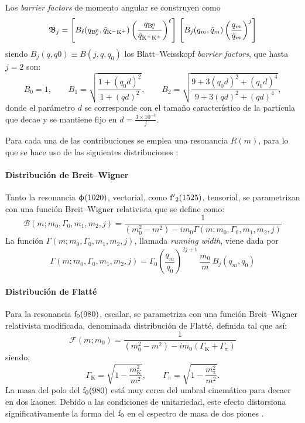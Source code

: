 Los \emph{barrier factors} de momento angular se construyen como \cite{blatt2012theoretical}
\begin{equation}
\mathfrak{B}_j = \left[ B_{\ell}(q_{\mathrm{B}{}_{\mathrm{s}}^{0}},\tilde{q}_{\mathrm{K}{}^{-}\mathrm{K}{}^{+}}) \left( \frac{q_{\mathrm{B}{}_{\mathrm{s}}^{0}}}{\tilde{q}_{\mathrm{K}{}^{-}\mathrm{K}{}^{+}}} \right)^{\ell}\right] \, \left[ B_j(q_m,\tilde{q}_m) \left( \frac{q_m}{\tilde{q}_m} \right)^j\right]
\end{equation}
siendo $B_j(q,q0) \equiv B(j,q,q_0)$ los Blatt--Weisskopf \emph{barrier factors}, que hasta $j=2$ son:
\begin{equation} 
B_0 = 1, \qquad B_1 = \sqrt{\frac{1+(q_0d)^2}{1+(qd)^2}}, \qquad B_2 = \sqrt{\frac{9+3(q_0d)^2+(q_0d)^4}{9+3(qd)^2+(qd)^4}},
\end{equation}
donde el parámetro $d$ se corresponde con el tamaño característico de la partícula que decae y se mantiene fijo en $d = \frac{3\times10^{-3}}{j}$.



Para cada una de las contribuciones se emplea una resonancia $R(m)$, para lo que se hace uso de las siguientes distribuciones \cite{paperPhis}:

\paragraph{Distribución de Breit--Wigner}

Tanto la resonancia $\upphi(1020)$, vectorial, como $\mathrm{f'}_2(1525)$, tensorial, se parametrizan con una función Breit--Wigner relativista que se define como: 
\begin{equation}
\mathcal{B}(m;m_0,\Gamma_0,m_1,m_2,j) = \frac{1}{(m_0^2-m^2)-im_0\Gamma(m;m_0,\Gamma_0,m_1,m_2,j)}
\end{equation}
La función $\Gamma(m;m_0,\Gamma_0,m_1,m_2,j)$, llamada \emph{running width}, viene dada por
\begin{equation}
	\Gamma(m;m_0,\Gamma_0,m_1,m_2,j) = \Gamma_0 \left(\frac{q_m}{q_0}\right)^{2j+1}\, \frac{m_0}{m} \, B_j (q_m,q_0)
\end{equation}


\paragraph{Distribución de Flatté}

Para la resonancia $\mathrm{f}_0(980)$, escalar,  se parametriza con una función Breit--Wigner relativista modificada, denominada distribución de Flatté, definida tal que así: 
\begin{equation}
\mathcal{F}(m;m_0) = \frac{1}{(m_0^2-m^2)-im_0(\Gamma_\text{K}+\Gamma_{\uppi})}
\end{equation}
siendo,
\begin{equation}
	\Gamma_{\text{K}} = \sqrt{1-\frac{m_{\text{K}}^2}{m^2}}, \qquad 	\Gamma_{\uppi} = \sqrt{1-\frac{m_{\uppi}^2}{m^2}}.
\end{equation}
La masa del polo del $\mathrm{f}_0(980)$ está muy cerca del umbral cinemático para decaer en dos kaones. Debido a las condiciones de unitariedad, este efecto distorsiona significativamente la forma del $\mathrm{f}_0$ en el espectro de masa de dos piones \cite{baru2005flatte}. 




